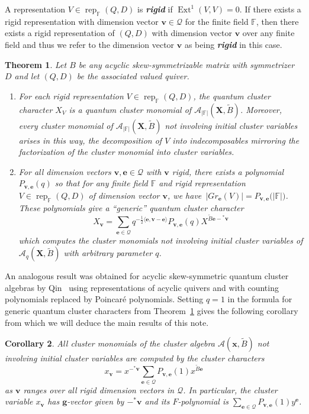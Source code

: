 \documentclass[12pt]{amsart}
\newtheorem{theorem}{Theorem}
\newtheorem{corollary}[theorem]{Corollary}
\newcommand{\bfe}{\mathbf{e}}
\newcommand{\bfg}{\mathbf{g}}
\newcommand{\bfv}{\mathbf{v}}
\newcommand{\bfx}{\mathbf{x}}
\newcommand{\bfX}{\mathbf{X}}
\newcommand{\cA}{\mathcal{A}}
\newcommand{\cQ}{\mathcal{Q}}
\newcommand{\FF}{\mathbb{F}}
\newcommand{\Ext}{\operatorname{Ext}}
\newcommand{\half}{{\frac{1}{2}}}
\newcommand{\rep}{\operatorname{rep}}
\newcommand{\newword}[1]{\textbf{\emph{#1}}}
\newenvironment{enumeratea}{\begin{enumerate}[\upshape (a)]}{\end{enumerate}}
\begin{document}
  A representation $V\in\rep_\FF(Q,D)$ is \newword{rigid} if $\Ext^1(V,V)=0$.
  If there exists a rigid representation with dimension vector $\bfv\in\cQ$ for the finite field $\FF$, then there exists a rigid representation of $(Q,D)$ with dimension vector $\bfv$ over any finite field and thus we refer to the dimension vector $\bfv$ as being \newword{rigid} in this case.
  \begin{theorem}\cite{rupel1,rupel2}
    \label{th:quantum cluster characters}
    Let $B$ be any acyclic skew-symmetrizable matrix with symmetrizer $D$ and let $(Q,D)$ be the associated valued quiver.
    \begin{enumeratea}
      \item 
        For each rigid representation $V\in\rep_\FF(Q,D)$, the quantum cluster character $X_V$ is a quantum cluster monomial of $\cA_{|\FF|}(\bfX,\widetilde{B})$.  
        Moreover, every cluster monomial of $\cA_{|\FF|}(\bfX,\widetilde{B})$ not involving initial cluster variables arises in this way, the decomposition of $V$ into indecomposables mirroring the factorization of the cluster monomial into cluster variables.
      
      \item 
        For all dimension vectors $\bfv,\bfe\in\cQ$ with $\bfv$ rigid, there exists a polynomial $P_{\bfv,\bfe}(q)$ so that for any finite field $\FF$ and rigid representation $V\in\rep_\FF(Q,D)$ of dimension vector $\bfv$, we have~$\big|Gr_\bfe(V)\big|=P_{\bfv,\bfe}\big(|\FF|\big)$.
        These polynomials give a ``generic'' quantum cluster character 
        \[
          X_\bfv=\sum\limits_{\bfe\in\cQ} q^{-\half\langle\bfe,\bfv-\bfe\rangle}P_{\bfv,\bfe}(q)X^{\widetilde{B}\bfe-{}^*\bfv}
        \]
        which computes the cluster monomials not involving initial cluster variables of $\cA_q(\bfX,\widetilde{B})$ with arbitrary parameter $q$.
    \end{enumeratea}
  \end{theorem}
  An analogous result was obtained for acyclic skew-symmetric quantum cluster algebras by Qin~\cite{qin} using representations of acyclic quivers and with counting polynomials replaced by Poincar\'e polynomials.
  Setting $q=1$ in the formula for generic quantum cluster characters from Theorem~\ref{th:quantum cluster characters} gives the following corollary from which we will deduce the main results of this note.
  \begin{corollary}
    \label{cor:classical cluster characters}
    All cluster monomials of the cluster algebra $\cA(\bfx,\widetilde{B})$ not involving initial cluster variables are computed by the cluster characters
    \[
      x_\bfv
      =
      x^{-{}^*\bfv}\sum\limits_{\bfe\in\cQ} P_{\bfv,\bfe}(1)x^{\widetilde{B}\bfe}
    \]
    as $\bfv$ ranges over all rigid dimension vectors in $\cQ$.
    In particular, the cluster variable $x_\bfv$ has $\bfg$-vector given by $-{}^*\bfv$ and its $F$-polynomial is $\sum\limits_{\bfe\in\cQ} P_{\bfv,\bfe}(1)y^\bfe$.
  \end{corollary}
\end{document}
